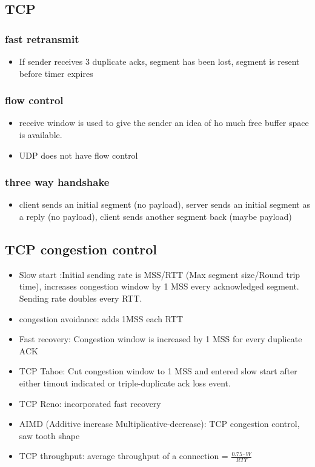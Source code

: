 \documentclass[11pt]{article}
\begin{document}
\subsection{TCP}
\label{sec:org77660a2}
\subsubsection{fast retransmit}
\label{sec:org2a4cc54}
\begin{itemize}
\item If sender receives 3 duplicate acks, segment has been lost, segment is resent
before timer expires
\end{itemize}

\subsubsection{flow control}
\label{sec:orga152324}
\begin{itemize}
\item receive window is used to give the sender an idea of ho much free buffer
space is available.
\item UDP does not have flow control
\end{itemize}
\subsubsection{three way handshake}
\label{sec:orgb6c1969}
\begin{itemize}
\item client sends an initial segment (no payload), server sends an initial segment
as a reply (no payload), client sends another segment back (maybe payload)
\end{itemize}


\subsection{TCP congestion control}
\label{sec:org768684d}
\begin{itemize}
\item Slow start
:Initial sending rate is MSS/RTT (Max segment size/Round trip time), increases
congestion window by 1 MSS every acknowledged segment. Sending rate doubles
every RTT.
\item congestion avoidance: adds 1MSS each RTT
\item Fast recovery: Congestion window is increased by 1 MSS for every duplicate ACK
\item TCP Tahoe: Cut congestion window to 1 MSS and entered slow start
after either timout indicated or triple-duplicate ack loss event.
\item TCP Reno: incorporated fast recovery
\item AIMD (Additive increase Multiplicative-decrease): TCP congestion control, saw
tooth shape
\item TCP throughput: average throughput of a connection = \(\frac{0.75 \cdot W}{RTT}\)
\end{itemize}

\end{document}
